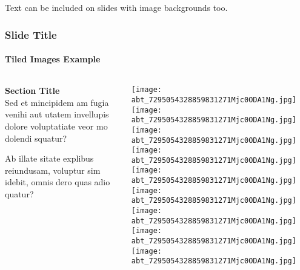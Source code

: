 \documentclass[
	aspectratio=169, %
	t, %
	onlytextwidth, %
	10pt, %
]{beamer}
\begin{document}
\begingroup
	
	\begin{frame}
		Text can be included on slides with image backgrounds too.
	\end{frame}
\endgroup


\begin{frame}
	\frametitle{Slide Title}
	\framesubtitle{Tiled Images Example}
	
	\small %
	
	\begin{columns}[T] %
		\begin{column}{0.3\linewidth} %
			\textbf{Section Title}\\
			Sed et mincipidem am fugia venihi aut utatem invellupis dolore voluptatiate veor mo dolendi squatur?

			Ab illate sitate explibus reiundusam, voluptur sim idebit, omnis dero quas adio quatur?
		\end{column}
		\begin{column}{0.68\linewidth} %
			\vspace{-3.5\baselineskip} %
			
			\texttt{[image: abt\_7295054328859831271Mjc0ODA1Ng.jpg]}\hfill\texttt{[image: abt\_7295054328859831271Mjc0ODA1Ng.jpg]}\hfill\texttt{[image: abt\_7295054328859831271Mjc0ODA1Ng.jpg]}\\[6pt]
			\texttt{[image: abt\_7295054328859831271Mjc0ODA1Ng.jpg]}\hfill\texttt{[image: abt\_7295054328859831271Mjc0ODA1Ng.jpg]}\hfill\texttt{[image: abt\_7295054328859831271Mjc0ODA1Ng.jpg]}\\[6pt]
			\texttt{[image: abt\_7295054328859831271Mjc0ODA1Ng.jpg]}\hfill\texttt{[image: abt\_7295054328859831271Mjc0ODA1Ng.jpg]}\hfill\texttt{[image: abt\_7295054328859831271Mjc0ODA1Ng.jpg]}\par
		\end{column}
	\end{columns}
\end{frame}
\end{document}
